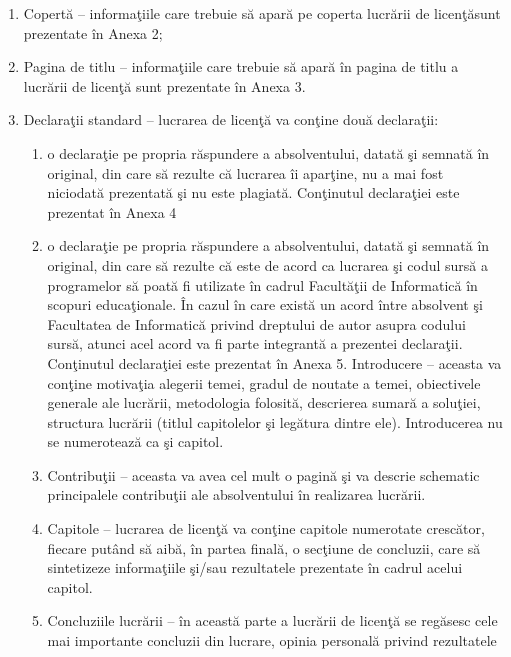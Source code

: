 \documentclass{article}
\begin{document}
 \begin{enumerate}
   \item Copert\u{a} – informaţiile care trebuie s\u{a} apar\u{a} pe coperta lucr\u{a}rii de licenţ\u{a}sunt prezentate \^{i}n Anexa 2;
   \item Pagina de titlu – informaţiile care trebuie s\u{a} apar\u{a} \^{i}n pagina de titlu a lucr\u{a}rii de licenţ\u{a} sunt prezentate \^{i}n Anexa 3. 
   \item Declaraţii standard – lucrarea de licenţ\u{a} va conţine dou\u{a} declaraţii:
   \begin{enumerate}
     \item o declaraţie pe propria r\u{a}spundere a absolventului, datat\u{a} şi
	semnat\u{a} \^{i}n original, din care s\u{a} rezulte c\u{a} lucrarea \^{i}i aparţine, nu a
	mai fost niciodat\u{a} prezentat\u{a} şi nu este plagiat\u{a}. Conţinutul
	declaraţiei este prezentat \^{i}n Anexa 4
     \item o declaraţie pe propria r\u{a}spundere a absolventului, datat\u{a} şi
	semnat\u{a} \^{i}n original, din care s\u{a} rezulte c\u{a} este de acord ca
	lucrarea şi codul surs\u{a} a programelor s\u{a} poat\u{a} fi utilizate \^{i}n cadrul
	Facult\u{a}ţii de Informatic\u{a} \^{i}n scopuri educaţionale. \^{I}n cazul \^{i}n care 
	exist\u{a} un acord \^{i}ntre absolvent şi Facultatea de Informatic\u{a} privind
	dreptului de autor asupra codului surs\u{a}, atunci acel acord va fi
	parte integrant\u{a} a prezentei declaraţii. Conţinutul declaraţiei este
	prezentat \^{i}n Anexa 5. 
	Introducere – aceasta va conţine motivaţia alegerii temei, gradul de
	noutate a temei, obiectivele generale ale lucr\u{a}rii, metodologia folosit\u{a},
	descrierea sumar\u{a} a soluţiei, structura lucr\u{a}rii (titlul capitolelor şi leg\u{a}tura
	dintre ele). Introducerea nu se numeroteaz\u{a} ca şi capitol.
      \item Contribuţii – aceasta va avea cel mult o pagin\u{a} şi va descrie schematic
	principalele contribuţii ale absolventului \^{i}n realizarea lucr\u{a}rii.
      \item Capitole – lucrarea de licenţ\u{a} va conţine capitole numerotate cresc\u{a}tor,
	fiecare putând s\u{a} aib\u{a}, \^{i}n partea final\u{a}, o secţiune de concluzii, care s\u{a}
	sintetizeze informaţiile şi/sau rezultatele prezentate \^{i}n cadrul acelui
	capitol.
      \item Concluziile lucr\u{a}rii – \^{i}n aceast\u{a} parte a lucr\u{a}rii de licenţ\u{a} se reg\u{a}sesc cele
	mai importante concluzii din lucrare, opinia personal\u{a} privind rezultatele

\end{enumerate}
\end{enumerate}
\end{document}
